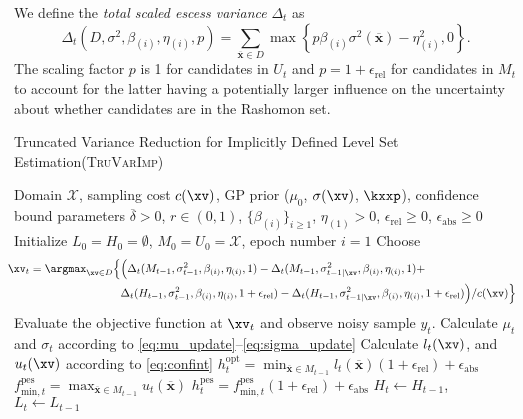 \documentclass[a4paper,10pt]{article}
\newcommand{\TruVarImp}{\textsc{TruVarImp}\xspace}
\newcommand{\xbar}{\mbox{$\overline{\mathbf{x}}$}}
\newcommand{\deltabar}{\overline{\delta}}
\newcommand{\cset}{\mathcal{X}}
\begin{document}
{    We define the \emph{total scaled escess variance} $\Delta_t$ as
    \begin{equation}
        \Delta_t(D, \sigma^2, \beta_{(i)}, \eta_{(i)}, p) = \sum_{\xbar \in D}\max\left\{ p \beta_{(i)} \sigma^2(\xbar) - \eta_{(i)}^2, 0 \right\}\mathrm{.}
    \end{equation}
    The scaling factor $p$ is 1 for candidates in $U_t$ and $p = 1 + \epsilon_{\mathrm{rel}}$ for candidates in $M_t$ to account for the latter having a potentially larger influence on the uncertainty about whether candidates are in the Rashomon set.
}

\begin{algorithm}
	\caption{Truncated Variance Reduction for Implicitly Defined Level Set Estimation(\TruVarImp)} \label{alg:truvarimp}
	\begin{algorithmic}[1]
		\Require Domain $\cset$, sampling cost $c(\xv)$, GP prior ($\mu_0$, $\sigma(\xv)$, $\kxxp$), confidence bound parameters $\deltabar > 0$, $r \in (0,1)$, $\{\beta_{(i)}\}_{i \ge 1}$, $\eta_{(1)} > 0$, $\epsilon_{\mathrm{rel}} \ge 0$, $\epsilon_{\mathrm{abs}} \ge 0$
		\State Initialize $L_0=H_0=\emptyset$, $M_0=U_0=\cset$, epoch number $i=1$
		\State  Choose
            \begin{equation}
                \begin{split}
                    \hspace*{-1.5ex}  \xv_t = \argmax_{\xv \in D} \Big\{&\Bigl(\Delta_t(M_{t-1}, \sigma_{t-1}^2, \beta_{(i)}, \eta_{(i)}, 1) - \Delta_t(M_{t-1}, \sigma_{t-1|\xv}^2, \beta_{(i)}, \eta_{(i)}, 1) + \\
                    &\Delta_t(H_{t-1}, \sigma_{t-1}^2, \beta_{(i)}, \eta_{(i)}, 1 + \epsilon_{\mathrm{rel}}) - \Delta_t(H_{t-1}, \sigma_{t-1|\xv}^2, \beta_{(i)}, \eta_{(i)}, 1 + \epsilon_{\mathrm{rel}})\Bigr) / c(\xv) \Big\}
                \end{split}
            \end{equation}
		\State Evaluate the objective function at $\xv_t$ and observe noisy sample $y_t$.
        \State Calculate $\mu_t$ and $\sigma_t$ according to \eqref{eq:mu_update}--\eqref{eq:sigma_update}
        \State Calculate $l_t(\xv)$, and $u_t(\xv)$ according to \eqref{eq:confint}
        \State $h_t^\mathrm{opt} = \min_{\xbar \in M_{t-1}} l_t(\xbar) (1 + \epsilon_{\mathrm{rel}}) + \epsilon_{\mathrm{abs}}$
        \State $f_{\mathrm{min},t}^\mathrm{pes} = \max_{\xbar \in M_{t-1}} u_t(\xbar)$
        \State $h_t^\mathrm{pes} = f_{\mathrm{min},t}^\mathrm{pes} (1 + \epsilon_{\mathrm{rel}}) + \epsilon_{\mathrm{abs}}$
        \State $H_t \leftarrow H_{t-1}$, $L_t \leftarrow L_{t-1}$


\end{algorithmic}
\end{algorithm}
\end{document}
